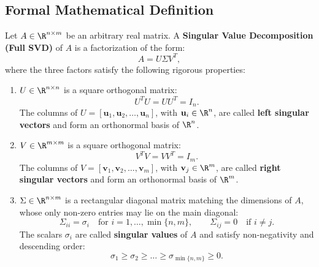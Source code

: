 \subsection{Formal Mathematical Definition}

\begin{definition}
\label{def:full-svd-en}
Let $A \in \R^{n \times m}$ be an arbitrary real matrix. A \textbf{Singular Value Decomposition (Full SVD)} of $A$ is a factorization of the form:
\begin{equation}
    A = U \Sigma V^T,
\end{equation}
where the three factors satisfy the following rigorous properties:
\begin{enumerate}
    \item $U \in \R^{n \times n}$ is a square orthogonal matrix:
    \begin{equation}
        U^T U = U U^T = I_n.
    \end{equation}
    The columns of $U = [\mathbf{u}_1, \mathbf{u}_2, \dots, \mathbf{u}_n]$, with $\mathbf{u}_i \in \R^n$, are called \textbf{left singular vectors} and form an orthonormal basis of $\R^n$.

    \item $V \in \R^{m \times m}$ is a square orthogonal matrix:
    \begin{equation}
        V^T V = V V^T = I_m.
    \end{equation}
    The columns of $V = [\mathbf{v}_1, \mathbf{v}_2, \dots, \mathbf{v}_m]$, with $\mathbf{v}_j \in \R^m$, are called \textbf{right singular vectors} and form an orthonormal basis of $\R^m$.

    \item $\Sigma \in \R^{n \times m}$ is a rectangular diagonal matrix matching the dimensions of $A$, whose only non-zero entries may lie on the main diagonal:
    \begin{equation}
        \Sigma_{ii} = \sigma_i \quad \text{for } i = 1, \dots, \min\{n, m\}, \qquad \Sigma_{ij} = 0 \quad \text{if } i \neq j.
    \end{equation}
    The scalars $\sigma_i$ are called \textbf{singular values} of $A$ and satisfy non-negativity and descending order:
    \begin{equation}
        \sigma_1 \ge \sigma_2 \ge \dots \ge \sigma_{\min\{n, m\}} \ge 0.
    \end{equation}
\end{enumerate}
\end{definition}

